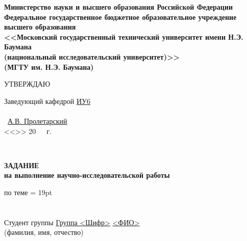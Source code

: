 \documentclass[utf8x, 12pt, oneside, a4paper]{article}
\begin{document}
	\thispagestyle{empty}
	\begin{center}
		\fontsize{11pt}{0.4\baselineskip}\selectfont \textbf{Министерство науки и высшего образования Российской Федерации 
		\\ Федеральное государственное бюджетное образовательное учреждение 
		\\ высшего образования 
		\\ <<Московский государственный технический университет имени Н.Э. Баумана
		\\ (национальный исследовательский университет)>>
		\\ (МГТУ им. Н.Э. Баумана)}
		
		\fontsize{12pt}{0.5\baselineskip}\selectfont
		\noindent \makebox[\linewidth]{\rule{\textwidth}{4pt}} \makebox[\linewidth]{\rule{\textwidth}{1pt}}
	\end{center}	
	
	\begin{flushright}
		\fontsize{12pt}{\baselineskip}\selectfont
		УТВЕРЖДАЮ \hspace*{1.4cm}

		\fontsize{12pt}{\baselineskip}\selectfont
		Заведующий кафедрой \uline{\hspace*{0.5cm}}\uline{ИУ6}\uline{\hspace*{0.5cm}} 
		\\ \
		\\ \hfill \uline{\hspace*{2.5cm}} \ \uline{А.В. Пролетарский} 
		\\ <<\uline{\hspace*{1cm}}>> \uline{\hspace*{2.5cm}} 20\ \ \   г. %
	\end{flushright}
	\
	\begin{center}
		\fontsize{18pt}{\baselineskip}\selectfont \textbf{ЗАДАНИЕ}
		\\ \fontsize{16pt}{\baselineskip}\selectfont \textbf{на выполнение научно-исследовательской работы}
	\end{center}

	\normalsize

	\begin{flushleft}
		по теме  \uline{\hfill} \baselineskip = 19pt
		\\ \uline{\hfill}
		\\ \uline{\hfill}
		\\ Студент группы  \uline{\hspace*{0.5cm}}\uline{Группа <Шифр>}\uline{\hspace*{0.5cm}}
		\center \uline{\hfill <ФИО> \hfill}
		\\ \fontsize{10pt}{\baselineskip}\selectfont(фамилия, имя, отчество)
	\end{flushleft}
\end{document}
